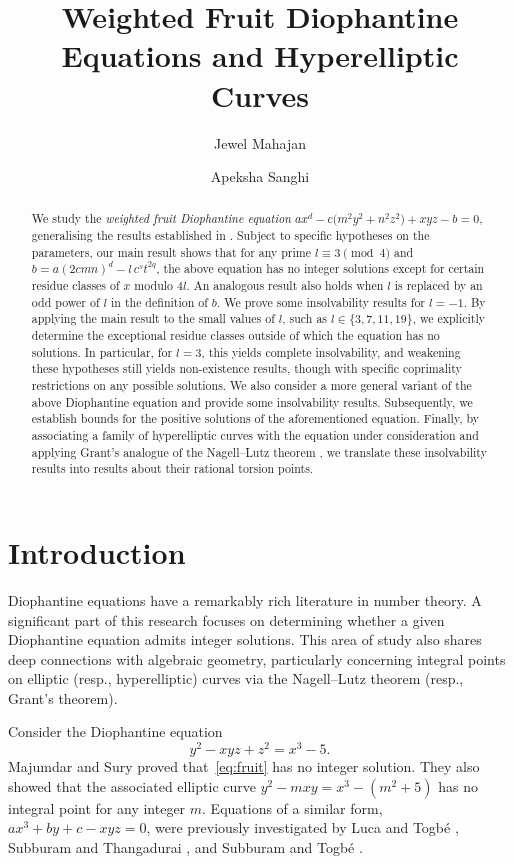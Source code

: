 \documentclass[11pt,a4paper]{amsart}
\title{\bfseries Weighted Fruit Diophantine Equations and Hyperelliptic Curves}
\author{Jewel Mahajan}
\author{Apeksha Sanghi}
\theoremstyle{plain}
\theoremstyle{definition}
\begin{document}
\begin{abstract}
We study the \textit{weighted fruit Diophantine equation} $  ax^{d} - c\bigl(m^{2}y^{2}+n^{2}z^{2}\bigr) + xyz - b = 0$, generalising the results established in \cite{MajumdarSury,VaishyaSharma,PrakashChakraborty}.
Subject to specific hypotheses on the parameters, our main result shows that for any prime $l \equiv 3 \pmod 4$ and $b = a (2 c m n)^{d} - l\, c^{s}t^{2q}$, the above equation has no integer solutions except for certain residue classes of $x$ modulo $4l$. An analogous result also holds when $l$ is replaced by an odd power of $l$ in the definition of $b$. We prove some insolvability results for $l=-1$. By applying the main result to the small values of $l$, such as $l \in \{3, 7, 11, 19\}$, we explicitly determine the exceptional residue classes outside of which the equation has no solutions. In particular, for $l = 3$, this yields complete insolvability, and weakening these hypotheses still yields non-existence results, though with specific coprimality restrictions on any possible solutions. We also consider a more general variant of the above Diophantine equation and provide some insolvability results. Subsequently, we establish bounds for the positive solutions of the aforementioned equation. Finally, by associating a family of hyperelliptic curves with the equation under consideration and applying Grant's analogue of the Nagell--Lutz theorem \cite{Grant}, we translate these insolvability results into results about their rational torsion points.
\end{abstract}

\maketitle

\section{Introduction}\label{sec:intro}
Diophantine equations have a remarkably rich literature in number theory. A significant part of this research focuses on determining whether a given Diophantine equation admits integer solutions. This area of study also shares deep connections with algebraic geometry, particularly concerning integral points on elliptic (resp., hyperelliptic) curves via the Nagell--Lutz theorem (resp., Grant's theorem).

Consider the Diophantine equation
\begin{equation}\label{eq:fruit}
  y^2 - xyz + z^2 = x^3 - 5.
\end{equation}
Majumdar and Sury \cite{MajumdarSury} proved that~\eqref{eq:fruit} has no integer solution. They also showed that the associated elliptic curve $y^2 - mxy = x^3 - (m^2 + 5)$ has no integral point for any integer $m$. Equations of a similar form, $ax^3 + by + c - xyz = 0$, were previously investigated by Luca and Togb\'e \cite{LucaTogbe2008, Togbe2009}, Subburam and Thangadurai \cite{SubburamThangadurai2014, SubburamThangadurai2015}, and Subburam and Togb\'e \cite{SubburamTogbe2017}.
\end{document}
